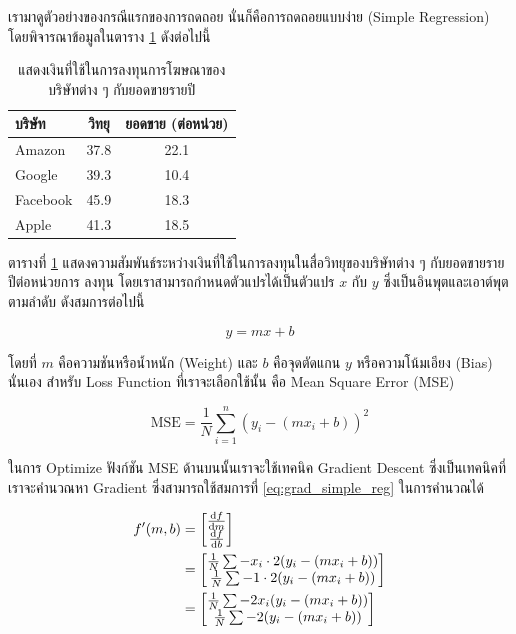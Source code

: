 เรามาดูตัวอย่างของกรณีแรกของการถดถอย นั่นก็คือการถดถอยแบบง่าย (Simple Regression) โดยพิจารณาข้อมูลในตาราง 
\ref{tab:simple_reg_data} ดังต่อไปนี้ 

\begin{table}[htbp]
    \centering
    \caption{แสดงเงินที่ใช้ในการลงทุนการโฆษณาของบริษัทต่าง ๆ กับยอดขายรายปี}
    \label{tab:simple_reg_data}
    \begin{tabular}{lcc}
    \toprule
    \textbf{บริษัท} &\textbf{วิทยุ} &\textbf{ยอดขาย (ต่อหน่วย)} \\
    \midrule
    Amazon &37.8 &22.1 \\
    Google &39.3 &10.4 \\
    Facebook &45.9 &18.3 \\
    Apple &41.3 &18.5 \\
    \bottomrule
    \end{tabular}
\end{table}

ตารางที่ \ref{tab:simple_reg_data} แสดงความสัมพันธ์ระหว่างเงินที่ใช้ในการลงทุนในสื่อวิทยุของบริษัทต่าง ๆ กับยอดขายรายปีต่อหน่วยการ%
ลงทุน โดยเราสามารถกำหนดตัวแปรได้เป็นตัวแปร $x$ กับ $y$ ซึ่งเป็นอินพุตและเอาต์พุตตามลำดับ ดังสมการต่อไปนี้

\begin{equation}
    y = mx + b
\end{equation}

\noindent โดยที่ $m$ คือความชันหรือน้ำหนัก (Weight) และ $b$ คือจุดตัดแกน $y$ หรือความโน้มเอียง (Bias) นั่นเอง สำหรับ Loss 
Function ที่เราจะเลือกใช้นั้น คือ Mean Square Error (MSE)

\begin{equation}
    \text{MSE} = \frac{1}{N} \sum_{i=1}^{n} (y_i - (m x_i + b))^2
\end{equation}

ในการ Optimize ฟังก์ชัน MSE ด้านบนนั้นเราจะใช้เทคนิค Gradient Descent ซึ่งเป็นเทคนิคที่เราจะคำนวณหา Gradient ซึ่งสามารถใช้สมการที่
\ref{eq:grad_simple_reg} ในการคำนวณได้

\begin{align}\label{eq:grad_simple_reg}
    f'(m,b) &=
      \begin{bmatrix}
        \dv{f}{m} \\
        \dv{f}{b} \\
      \end{bmatrix} \\
    &=
      \begin{bmatrix}
        \frac{1}{N} \sum -x_i \cdot 2(y_i - (mx_i + b)) \\
        \frac{1}{N} \sum -1 \cdot 2(y_i - (mx_i + b)) \\
      \end{bmatrix} \\
    &=
      \begin{bmatrix}
         \frac{1}{N} \sum -2x_i(y_i - (mx_i + b)) \\
         \frac{1}{N} \sum -2(y_i - (mx_i + b)) \\
      \end{bmatrix}
\end{align}

